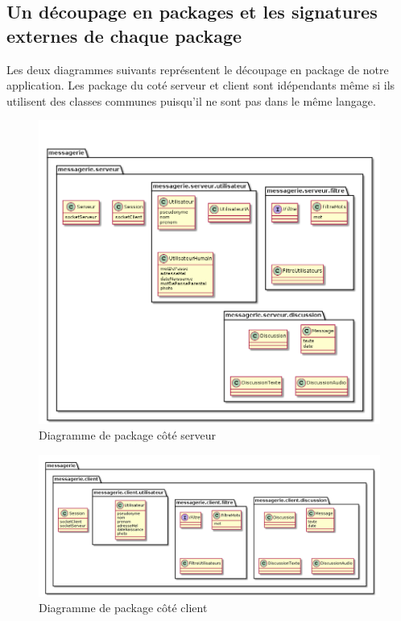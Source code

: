 \documentclass[a4paper,12pt]{article}
\begin{document}
	\subsection{Un découpage en packages et les signatures externes de chaque package}
	Les deux diagrammes suivants représentent le découpage en package de notre application.
	Les package du coté serveur et client sont idépendants même si ils utilisent des classes communes puisqu'il ne sont pas dans le même langage.
	\begin{figure}[H]
		\centerline{\includegraphics[width=16.5cm]{../diagrammes/img/packageServeur.png}}
		\caption{Diagramme de package côté serveur}
	\end{figure}

	\begin{figure}[H]
		\centerline{\includegraphics[width=16.5cm]{../diagrammes/img/packageClient.png}}
		\caption{Diagramme de package côté client}
	\end{figure}
\end{document}
